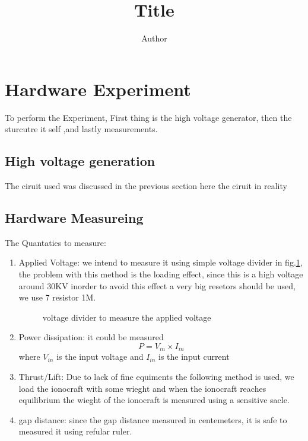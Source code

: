 \documentclass[a4paper,11pt,table]{article}
\title{Title}
\author{Author}
\begin{document}
{}

\section{Hardware Experiment}
To perform the Experiment, First thing is the high voltage 
generator, then the sturcutre it self ,and lastly measurements.
\subsection*{High voltage generation}
The ciruit used was discussed in the previous section here the 
ciruit in reality%
\subsection{Hardware Measureing}
The Quantaties to measure:
\begin{enumerate}
	\item Applied Voltage: we intend to measure it using simple
		voltage divider in fig.\ref{voltage_divider},
		the problem with this method is the loading effect, since 
		this is a high voltage around 30KV inorder to avoid this
		effect a very big resetors should be used, we use 7 resistor
		1M.
		\begin{figure}[ht]
			\centering
			\label{voltage_divider}
			
			\caption{voltage divider to measure the applied
			voltage}
		\end{figure}
		
	\item Power dissipation: it could be measured 
		\begin{equation}
			P = V_{in} \times I_{in}
		\end{equation}
		where $V_{in}$ is the input voltage and $I_{in}$ is the 
		input  current

	\item Thrust/Lift: Due to lack of fine equiments the following
		method is used, we load the ionocraft with some wieght and 
		when the ionocraft reaches equilibrium the wieght of the 
		ionocraft is measured using a sensitive sacle.

	\item gap distance: since the gap distance measured in
		centemeters, it is safe to measured it using refular ruler.
		
\end{enumerate}
\end{document}
